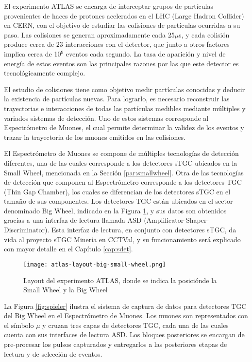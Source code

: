 	El experimento ATLAS se encarga de interceptar grupos de partículas provenientes de haces de protones acelerados en el LHC (Large Hadron Collider) en CERN, con el objetivo de estudiar las colisiones de partículas ocurridas a su paso. Las colisiones se generan aproximadamente cada 25$\mu$s\cite{Whiteson2016TheSystem}, y cada colisión produce cerca de 23 interacciones con el detector, que junto a otros factores implica cerca de 10$^9$ eventos cada segundo. La tasa de aparición y nivel de energía de estos eventos son las principales razones por las que este detector es tecnológicamente complejo.
	
	El estudio de colisiones tiene como objetivo medir partículas conocidas y deducir la existencia de partículas nuevas. Para lograrlo, es necesario reconstruir las trayectorias e interacciones de todas las partículas medibles mediante múltiples y variados sistemas de detección. Uno de estos sistemas corresponde al Espectrómetro de Muones\cite{Pontecorvo2004TheSpectrometer}, el cual permite determinar la validez de los eventos y trazar la trayectoria de los muones emitidos en las colisiones. 
	
	El Espectrómetro de Muones se compone de múltiples tecnologías de detección diferentes, una de las cuales corresponde a los detectores sTGC ubicados en la Small Wheel, mencionada en la Sección \ref{par:smallwheel}. Otra de las tecnologías de detección que componen al Espectrómetro corresponde a los detectores TGC (Thin Gap Chamber), los cuales se diferencian de los detectores sTGC en el tamaño de sus componentes. Los detectores TGC están ubicados en el sector denominado Big Wheel, indicado en la Figura \ref{fig:both-wheels}, y sus datos son obtenidos gracias a una interfaz de lectura llamada ASD (Amplificator-Shaper-Discriminator). Esta interfaz de lectura, en conjunto con detectores sTGC, da vida al proyecto sTGC Minería en CCTVal, y su funcionamiento será explicado con mayor detalle en el Capítulo \ref{cap:sdet}.
	
	\begin{figure}[h]
		\centering
		\texttt{[image: atlas-layout-big-small-wheel.png]} 
		\caption{Layout del experimento ATLAS, donde se indica la posiciónde la Small Wheel y la Big Wheel\cite{Formenti2018CERNReport}}
		\label{fig:both-wheels}
	\end{figure}
	
	La Figura \ref{fig:spieler} ilustra el sistema de captura de datos para detectores TGC del Big Wheel en el Espectrómetro de Muones. Los muones son representados con el símbolo $\mu$ y cruzan tres capas de detectores TGC, cada una de las cuales cuenta con sus interfaces de lectura ASD. Los bloques posteriores se encargan de pre-procesar los pulsos capturados y entregarlos a las posteriores etapas de lectura y de selección de eventos.
	
